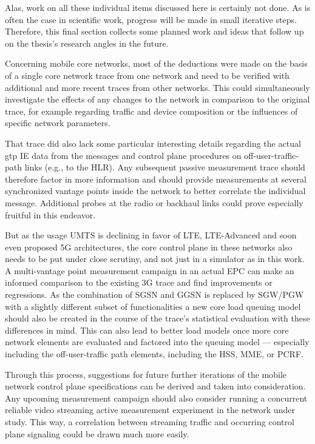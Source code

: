 Alas, work on all these individual items discussed here is certainly not done. As is often the case in scientific work, progress will be made in small iterative steps. Therefore, this final section collects some planned work and ideas that follow up on the thesis's research angles in the future.

Concerning mobile core networks, most of the deductions were made on the basis of a single core network trace from one network and need to be verified with additional and more recent traces from other networks. This could simultaneously investigate the effects of any changes to the network in comparison to the original trace, for example regarding traffic and device composition or the influences of specific network parameters.

That trace did also lack some particular interesting details regarding the actual \gls{gtp} \gls{IE} data from the messages and control plane procedures on off-user-traffic-path links (e.g., to the \gls{HLR}). Any subsequent passive measurement trace should therefore factor in more information and should provide measurements at several synchronized vantage points inside the network to better correlate the individual message. Additional probes at the radio or backhaul links could prove especially fruitful in this endeavor. 

But as the usage \gls{UMTS} is declining in favor of \gls{LTE}, \gls{LTE}-Advanced and soon even proposed 5G architectures, the core control plane in these networks also needs to be put under close scrutiny, and not just in a simulator as in this work. A multi-vantage point measurement campaign in an actual \gls{EPC} can make an informed comparison to the existing \gls{3G} trace and find improvements or regressions. As the combination of \gls{SGSN} and \gls{GGSN} is replaced by \gls{SGW}/\gls{PGW} with a slightly different subset of functionalities a new core load queuing model should also be created in the course of the trace's statistical evaluation with these differences in mind. This can also lead to better load models once more core network elements are evaluated and factored into the queuing model --- especially including the off-user-traffic path elements, including the \gls{HSS}, \gls{MME}, or \gls{PCRF}.

Through this process, suggestions for future further iterations of the mobile network control plane specifications can be derived and taken into consideration. Any upcoming measurement campaign should also consider running a concurrent reliable video streaming active measurement experiment in the network under study. This way, a correlation between streaming traffic and occurring control plane signaling could be drawn much more easily.


